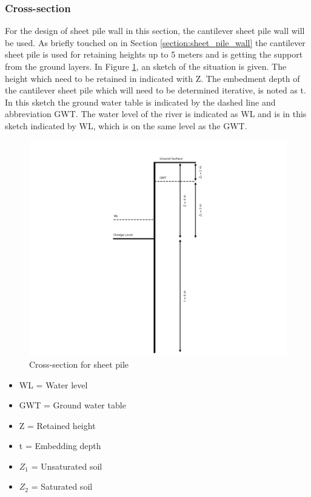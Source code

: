 \subsubsection{Cross-section}

For the design of sheet pile wall in this section, the cantilever sheet pile wall will be used. As briefly touched on in Section \ref{section:sheet_pile_wall} the cantilever sheet pile is used for retaining heights up to 5 meters and is getting the support from the ground layers. In Figure \ref{fig:problem_description_sheetpiles}, an sketch of the situation is given. The height which need to be retained in indicated with Z. The embedment depth of the cantilever sheet pile which will need to be determined iterative, is noted as t. In this sketch the ground water table is indicated by the dashed line and abbreviation GWT. The water level of the river is indicated as WL and is in this sketch indicated by WL, which is on the same level as the GWT. 


\begin{figure}[H]
    \centering
    \includegraphics[width=0.90\linewidth]{figures/ch8/cross_section.png}
    \caption{Cross-section for sheet pile}
    \label{fig:problem_description_sheetpiles}
\end{figure}

\begin{itemize}
    \item WL = Water level
    \item GWT = Ground water table
    \item Z = Retained height
    \item t = Embedding depth
    \item $Z_{1}$ = Unsaturated soil
    \item $Z_{2}$ = Saturated soil
\end{itemize}

